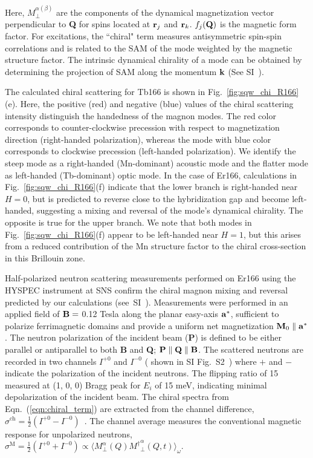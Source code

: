 \documentclass[
amsmath,amssymb,aps,showkeys, nofootinbib, twocolumn,superscriptaddress,longbibliography
]{revtex4-2}
\begin{document}
    Here, $M^{\alpha(\beta)}_{\perp}$ are the components of the dynamical magnetization vector perpendicular to {\bf Q} for spins located at ${\bf r}_j$ and ${\bf r}_k$. $f_j({\bf Q})$ is the magnetic form factor. For excitations, the ``chiral" term measures antisymmetric spin-spin correlations and is related to the SAM of the mode weighted by the magnetic structure factor. The intrinsic dynamical chirality of a mode can be obtained by determining the projection of SAM along the momentum ${\bf k}$ (See SI~\cite{sup}).

    The calculated chiral scattering for Tb166 is shown in Fig.~\ref{fig:sqw_chi_R166}(e). Here, the positive (red) and negative (blue) values of the chiral scattering intensity distinguish the handedness of the magnon modes. The red color corresponds to counter-clockwise precession with respect to magnetization direction (right-handed polarization), whereas the mode with blue color corresponds to clockwise precession (left-handed polarization). We identify the steep mode as a right-handed (Mn-dominant) acoustic mode and the flatter mode as left-handed (Tb-dominant) optic mode.  In the case of Er166, calculations in Fig.~\ref{fig:sqw_chi_R166}(f) indicate that the lower branch is right-handed near $H=0$, but is predicted to reverse close to the hybridization gap and become left-handed, suggesting a mixing and reversal of the mode's dynamical chirality.  The opposite is true for the upper branch.  We note that both modes in Fig.~\ref{fig:sqw_chi_R166}(f) appear to be left-handed near $H=1$, but this arises from a reduced contribution of the Mn structure factor to the chiral cross-section in this Brillouin zone.

    Half-polarized neutron scattering measurements performed on Er166 using the HYSPEC instrument at SNS confirm the chiral magnon mixing and reversal predicted by our calculations (see~SI~\cite{sup}). Measurements were performed in an applied field of ${\bf B}=$ 0.12 Tesla along the planar easy-axis ${\bf a}^*$, sufficient to polarize ferrimagnetic domains and provide a uniform net magnetization ${\bf M}_0 \parallel {\bf a}^*$. The neutron polarization of the incident beam ({\bf P}) is defined to be either parallel or antiparallel to both {\bf B} and {\bf Q}; ${\bf P}\parallel{\bf Q}\parallel{\bf B}$.  The scattered neutrons are recorded in two channels  $I^{+ 0}$ and $I^{- 0}$ ( shown in SI Fig.~S2~\cite{sup}) where $+$ and $-$ indicate the polarization of the incident neutrons. The flipping ratio of 15 measured at (1, 0, 0) Bragg peak for $E_i$ of 15 meV, indicating minimal depolarization of the incident beam. The chiral spectra from Eqn.~(\ref{eqn:chiral_term}) are extracted from the channel difference, $\sigma^{\text{ch}} = \frac{1}{2}(I^{+0}-I^{-0})$~\cite{chatterji2006neutron,simonet2012magnetic}. The channel average measures the conventional magnetic response for unpolarized neutrons, $\sigma^{\text{M}} = \frac{1}{2}(I^{+0}+I^{-0}) \propto \langle{M}_{\perp}^{\alpha}(Q) {M^\dagger}_{\perp}^{\alpha}(Q,t)\rangle_\omega$.
\end{document}
